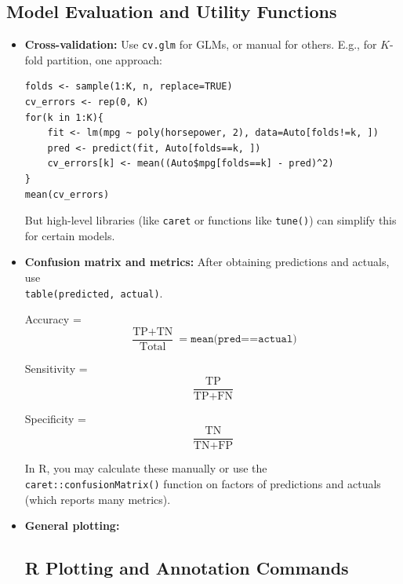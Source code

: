 \documentclass[11pt]{article}
\begin{document}
\subsection{Model Evaluation and Utility Functions}
\begin{itemize}
    \item \textbf{Cross-validation:} Use \texttt{cv.glm} for GLMs, or manual for others. E.g., for $K$-fold partition, one approach:
    \begin{verbatim}
folds <- sample(1:K, n, replace=TRUE)
cv_errors <- rep(0, K)
for(k in 1:K){
    fit <- lm(mpg ~ poly(horsepower, 2), data=Auto[folds!=k, ])
    pred <- predict(fit, Auto[folds==k, ])
    cv_errors[k] <- mean((Auto$mpg[folds==k] - pred)^2)
}
mean(cv_errors)
    \end{verbatim}
    But high-level libraries (like \texttt{caret} or functions like \texttt{tune()}) can simplify this for certain models.
    
    \item \textbf{Confusion matrix and metrics:} After obtaining predictions and actuals, use \\ \verb|table(predicted, actual)|. 

    Accuracy = 
    \[
    \frac{\text{TP} + \text{TN}}{\text{Total}} = \texttt{mean(pred==actual)}
    \]

    Sensitivity = 
    \[
    \frac{\text{TP}}{\text{TP} + \text{FN}}
    \]
    
    Specificity = 
    \[
    \frac{\text{TN}}{\text{TN} + \text{FP}}
    \]

    In R, you may calculate these manually or use the \texttt{caret::confusionMatrix()} function on factors of predictions and actuals (which reports many metrics).
    
    \item \textbf{General plotting:} 
    \subsection{R Plotting and Annotation Commands}\


\end{itemize}
\end{document}
